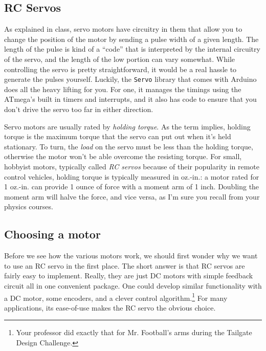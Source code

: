 \documentclass[11pt]{article} %
\begin{document}
\subsection*{RC Servos}

As explained in class, servo motors have circuitry in them that allow you to change the position of the motor by sending a pulse width of a given length. The length of the pulse is kind of a ``code'' that is interpreted by the internal circuitry of the servo, and the length of the low portion can vary somewhat. While controlling the servo is pretty straightforward, it would be a real hassle to generate the pulses yourself. Luckily, the \verb|Servo| library that comes with Arduino does all the heavy lifting for you. For one, it manages the timings using the ATmega's built in timers and interrupts, and it also has code to ensure that you don't drive the servo too far in either direction.

Servo motors are usually rated by \emph{holding torque}. As the term implies, holding torque is the maximum torque that the servo can put out when it's held stationary. To turn, the \emph{load} on the servo must be less than the holding torque, otherwise the motor won't be able overcome the resisting torque. For small, hobbyist motors, typically called \emph{RC servos} because of their popularity in remote control vehicles, holding torque is typically measured in oz.-in.: a motor rated for 1 oz.-in. can provide 1 ounce of force with a moment arm of 1 inch. Doubling the moment arm will halve the force, and vice versa, as I'm sure you recall from your physics courses.

\subsection*{Choosing a motor}

Before we see how the various motors work, we should first wonder why we want to use an RC servo in the first place. The short answer is that RC servos are fairly easy to implement. Really, they are just DC motors with simple feedback circuit all in one convenient package. One could develop similar functionality with a DC motor, some encoders, and a clever control algorithm.\footnote{Your professor did exactly that for Mr. Football's arms during the Tailgate Design Challenge.} For many applications, its ease-of-use makes the RC servo the obvious choice.
\end{document}
